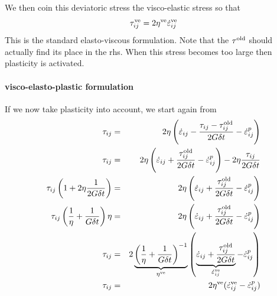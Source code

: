 We then coin this deviatoric stress the visco-elastic stress so that 
\[
\tau_{ij}^{\rm ve} = 2 \eta^{\rm ve} \dot{\varepsilon}_{ij}^{\rm ve} 
\]
This is the standard elasto-viscous formulation.
Note that the $\tau^{\rm old}$ should actually find its place 
in the rhs.
When this stress becomes too large then plasticity is activated.

\paragraph{visco-elasto-plastic formulation}

If we now take plasticity into account, we start again from 
\begin{eqnarray}
\tau_{ij} &=& 2\eta \left( \dot { \varepsilon}_{ij} - 
\frac{ {\tau}_{ij} - {\tau}_{ij}^{\rm old}  }{2 G \delta t}
- \dot {\varepsilon}_{ij}^{p} \right)
\nonumber\\
\tau_{ij}&=& 
2\eta \left( \dot { \varepsilon}_{ij} 
+ \frac{   {\tau}_{ij}^{\rm old}  }{2 G \delta t}
- \dot {\varepsilon}_{ij}^{p} \right)
- 2\eta 
\frac{ {\tau}_{ij} }{2 G \delta t}
\nonumber\\
\tau_{ij} \left( 1 +2\eta   \frac{ 1 }{2 G \delta t} \right)
&=& 2\eta \left( \dot { \varepsilon}_{ij} 
+ \frac{   {\tau}_{ij}^{\rm old}  }{2 G \delta t}
- \dot {\varepsilon}_{ij}^{p} \right)
\nonumber\\
\tau_{ij} \left( \frac{1}{\eta} +   \frac{ 1 }{ G \delta t} \right) \eta
&=& 2\eta \left( \dot { \varepsilon}_{ij} 
+ \frac{   {\tau}_{ij}^{\rm old}  }{2 G \delta t}
- \dot {\varepsilon}_{ij}^{p} \right)
\nonumber\\
\tau_{ij} &=& 2
\underbrace{ \left( \frac{1}{\eta} +   \frac{ 1 }{ G \delta t} \right)^{-1} }_{\eta^{\rm ve} }
\left( \underbrace{ \dot { \varepsilon}_{ij}  + \frac{   {\tau}_{ij}^{\rm old}  }{2 G \delta t} }_{ \dot{\varepsilon}_{ij}^{\rm ve} } - \dot {\varepsilon}_{ij}^{p} \right)
\nonumber\\
\tau_{ij} &=& 2 \eta^{\rm ve} ( \dot{\varepsilon}_{ij}^{\rm ve} - \dot {\varepsilon}_{ij}^{p} )
\label{bagf20_A15}
\end{eqnarray}

